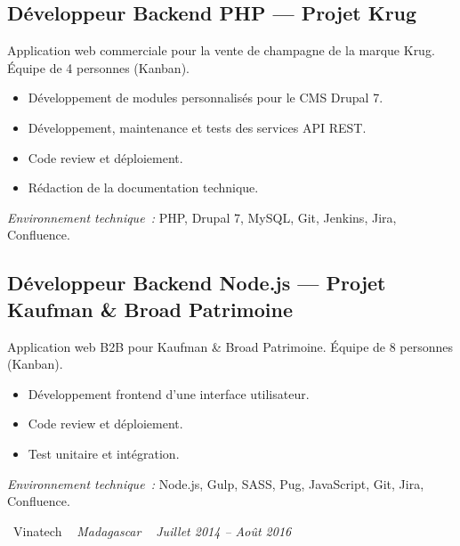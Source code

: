 \documentclass[10pt,a4paper]{article}
\begin{document}
\subsection*{Développeur Backend PHP --- Projet Krug}
\color{darkgray}
Application web commerciale pour la vente de champagne de la marque Krug. Équipe de 4 personnes (Kanban).
\begin{itemize}
  \item Développement de modules personnalisés pour le CMS Drupal 7.
  \item Développement, maintenance et tests des services API REST.
  \item Code review et déploiement.
  \item Rédaction de la documentation technique.
\end{itemize}
\textit{Environnement technique~:} PHP, Drupal 7, MySQL, Git, Jenkins, Jira, Confluence.

\vspace{6pt}

\subsection*{Développeur Backend Node.js --- Projet Kaufman \& Broad Patrimoine}
\color{darkgray}
Application web B2B pour Kaufman \& Broad Patrimoine. Équipe de 8 personnes (Kanban).
\begin{itemize}
  \item Développement frontend d'une interface utilisateur.
  \item Code review et déploiement.
  \item Test unitaire et intégration.
\end{itemize}
\textit{Environnement technique~:} Node.js, Gulp, SASS, Pug, JavaScript, Git, Jira, Confluence.

\vspace{10pt}

\noindent\textcolor{primary}{ \faBuilding\ Vinatech} \quad
\textit{ \small \textcolor{darkgray}{ \faMapMarker\ } Madagascar } \hfill
\textit{ \small \textcolor{darkgray}{ \faCalendar\ } Juillet 2014 -- Août 2016 }

\vspace{4pt}
\end{document}
